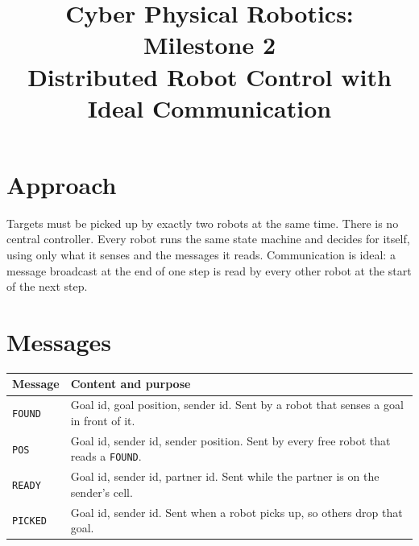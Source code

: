 \documentclass[11pt,a4paper]{article}
\title{Cyber Physical Robotics: Milestone 2\\
       \large Distributed Robot Control with Ideal Communication}
\author{}
\date{}
\begin{document}
\maketitle
\vspace{-2.5em}

\section{Approach}
Targets must be picked up by exactly two robots at the same time. There is no
central controller. Every robot runs the same state machine and decides for
itself, using only what it senses and the messages it reads. Communication is
ideal: a message broadcast at the end of one step is read by every other robot
at the start of the next step.

\section{Messages}
\begin{tabular}{@{}lp{11.2cm}@{}}
\toprule
\textbf{Message} & \textbf{Content and purpose}\\
\midrule
\texttt{FOUND} & Goal id, goal position, sender id. Sent by a robot that senses a goal in front of it.\\
\texttt{POS}   & Goal id, sender id, sender position. Sent by every free robot that reads a \texttt{FOUND}.\\
\texttt{READY} & Goal id, sender id, partner id. Sent while the partner is on the sender's cell.\\
\texttt{PICKED} & Goal id, sender id. Sent when a robot picks up, so others drop that goal.\\
\bottomrule
\end{tabular}
\end{document}
